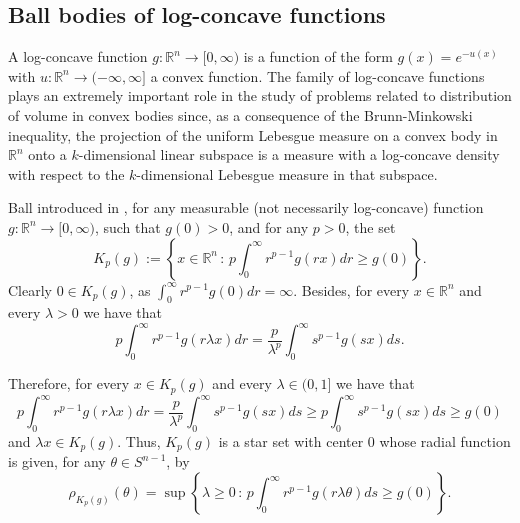 \documentclass[10pt]{amsart}
\def\R{\mathbb{R}}
\numberwithin{equation}{section}
\begin{document}
\subsection{Ball bodies of log-concave functions}\label{subsec:BallBodiesLogConcave}

A log-concave function $g:\R^n\to[0,\infty)$ is a function of the form $g(x)=e^{-u(x)}$ with $u:\R^n\to(-\infty,\infty]$ a convex function. The family of log-concave functions plays an extremely important role in the study of problems related to distribution of volume in convex bodies since, as a consequence of the Brunn-Minkowski inequality, the projection of the uniform Lebesgue measure on a convex body in $\R^n$ onto a $k$-dimensional linear subspace is a measure with a log-concave density with respect to the $k$-dimensional Lebesgue measure in that subspace.


Ball introduced in \cite{Ba}, for any measurable (not necessarily log-concave) function $g:\R^n\to[0,\infty)$, such that $g(0)>0$, and for any $p>0$, the set
\begin{equation}\label{eq:Definition p-BallBodies}
K_p(g):=\left\{x\in\R^n\,:\,p\int_0^\infty r^{p-1}g(rx)dr\geq g(0)\right\}.
\end{equation}
Clearly $0\in K_p(g)$, as $\displaystyle{\int_0^\infty r^{p-1}g(0)dr=\infty}$. Besides, for every $x\in \R^n$ and every $\lambda>0$ we have that
$$
p\int_0^\infty r^{p-1}g(r\lambda x)dr=\frac{p}{\lambda^p}\int_0^\infty s^{p-1}g(sx)ds.
$$

Therefore, for every $x\in K_p(g)$ and every $\lambda\in(0,1]$ we have that
$$
p\int_0^\infty r^{p-1}g(r\lambda x)dr=\frac{p}{\lambda^p}\int_0^\infty s^{p-1}g(sx)ds\geq p\int_0^\infty s^{p-1}g(sx)ds\geq g(0)
$$
and $\lambda x\in K_p(g)$. Thus, $K_p(g)$ is a star set with center $0$ whose radial function is given, for any $\theta\in S^{n-1}$, by
$$
\rho_{K_p(g)}(\theta)=\sup\left\{\lambda\geq0\,:\,p\int_0^\infty r^{p-1}g(r\lambda\theta)ds\geq g(0)\right\}.
$$
\end{document}
